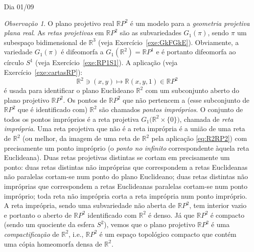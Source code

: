 \documentclass[oneside,11pt]{amsart}
\newcommand{\R}{\mathds R}
\theoremstyle{remark}\newtheorem{exercise}{Exercício}[section]
\theoremstyle{plain}\newtheorem{teo}{Teorema}[section]
\theoremstyle{plain}\newtheorem{lem}[teo]{Lema}
\theoremstyle{plain}\newtheorem{prop}[teo]{Proposição}
\theoremstyle{definition}\newtheorem{defin}[teo]{Definição}
\theoremstyle{remark}\newtheorem{rem}[teo]{Observação}
\theoremstyle{definition}\newtheorem{example}[teo]{Exemplo}
\numberwithin{equation}{section}
\begin{document}
\begin{section}{Dia 01/09}
\begin{rem}
O plano projetivo real $\R P^2$ é um modelo para a {\em geometria projetiva plana real}. As {\em retas projetivas\/} em $\R P^2$ são as subvariedades
$G_1(\pi)$, sendo $\pi$ um subespaço bidimensional de $\R^3$ (veja Exercício~\ref{exe:GkFGkE}). Obviamente, a variedade $G_1(\pi)$ é difeomorfa
a $G_1(\R^2)=\R P^1$ e é portanto difeomorfa ao círculo $S^1$ (veja Exercício~\ref{exe:RP1S1}). A aplicação (veja Exercício~\ref{exe:cartasRP}):
\begin{equation}\label{eq:R2RP2}
\R^2\ni(x,y)\longmapsto\R(x,y,1)\in\R P^2
\end{equation}
é usada para identificar o plano Euclideano $\R^2$ com um subconjunto aberto do plano projetivo $\R P^2$. Os pontos de $\R P^2$ que não pertencem a
(esse subconjunto de $\R P^2$ que é identificado com) $\R^2$ são chamados {\em pontos impróprios}. O conjunto de todos os pontos impróprios é a reta
projetiva $G_1\big(\R^2\times\{0\}\big)$, chamada de {\em reta imprópria}. Uma reta projetiva que não é a reta imprópria é a união de uma reta
de $\R^2$ (ou melhor, da imagem de uma reta de $\R^2$ pela aplicação \eqref{eq:R2RP2}) com precisamente um ponto impróprio (o {\em ponto no infinito\/}
correspondente àquela reta Euclideana). Duas retas projetivas distintas se cortam em precisamente um ponto: duas retas distintas não impróprias que
correspondem a retas Euclideanas não paralelas cortam-se num ponto do plano Euclideano; duas retas distintas não impróprias que correspondem
a retas Euclideanas paralelas cortam-se num ponto impróprio; toda reta não imprópria corta a reta imprópria num ponto impróprio.
A reta imprópria, sendo uma subvariedade não aberta de $\R P^2$, tem interior vazio e portanto o aberto de $\R P^2$ identificado com $\R^2$ é denso.
Já que $\R P^2$ é compacto (sendo um quociente da esfera $S^2$), vemos que o plano projetivo $\R P^2$ é uma {\em compactificação\/} de $\R^2$, i.e.,
$\R P^2$ é um espaço topológico compacto que contém uma cópia homeomorfa densa de $\R^2$.
\end{rem}


\end{section}
\end{document}
